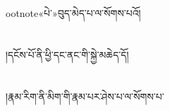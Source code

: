 ootnote{«པེ་»བུད་མེད་པ་}ལ་སོགས་པའོ།\chapter{ }།དངོས་པོ་ནི་ཕྱི་དང་ནང་གི་སྐྱེ་མཆེད་དོ།\chapter{ }།རྣམ་རིག་ནི་མིག་གི་རྣམ་པར་ཤེས་པ་ལ་སོགས་པ་